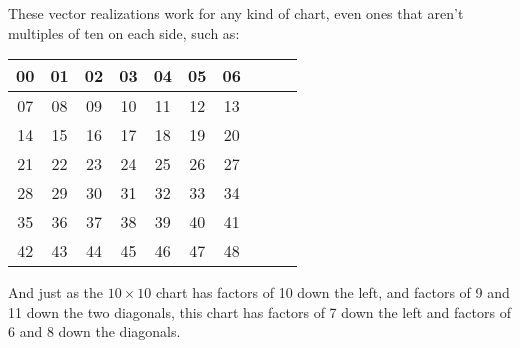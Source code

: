 \documentclass[12pt]{article}
\newcommand{\tablesize}{\footnotesize\sffamily}
\begin{document}
These vector realizations work for any kind of chart, even ones that
aren't multiples of ten on each side, such as:
\begin{center}\tablesize
\begin{tabular}{|c|c|c|c|c|c|c|c|c|c|}
\hline
 00 & 01 & 02 & 03 & 04 & 05 & 06 \\ \hline
 07 & 08 & 09 & 10 & 11 & 12 & 13 \\ \hline
 14 & 15 & 16 & 17 & 18 & 19 & 20 \\ \hline
 21 & 22 & 23 & 24 & 25 & 26 & 27 \\ \hline
 28 & 29 & 30 & 31 & 32 & 33 & 34 \\ \hline
 35 & 36 & 37 & 38 & 39 & 40 & 41 \\ \hline
 42 & 43 & 44 & 45 & 46 & 47 & 48 \\ \hline
\end{tabular}
\end{center}
And just as the $10\times 10$ chart has factors of 10 down the left,
and factors of 9 and 11 down the two diagonals, this chart has factors
of 7 down the left and factors of 6 and 8 down the diagonals.
\end{document}
